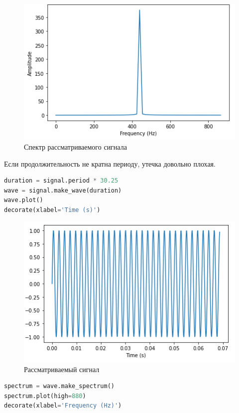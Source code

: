 \begin{figure}[H]
	\begin{center}
		\includegraphics[scale=1]{fig/lab03/lab03_02.png}
		\caption{Спектр рассматриваемого сигнала}
	\end{center}
\end{figure}

Если продолжительность не кратна периоду, утечка довольно плохая.

\begin{lstlisting}[language=Python]
duration = signal.period * 30.25
wave = signal.make_wave(duration)
wave.plot()
decorate(xlabel='Time (s)')
\end{lstlisting}

\begin{figure}[H]
	\begin{center}
		\includegraphics[scale=1]{fig/lab03/lab03_03.png}
		\caption{Рассматриваемый сигнал}
	\end{center}
\end{figure}

\begin{lstlisting}[language=Python]
spectrum = wave.make_spectrum()
spectrum.plot(high=880)
decorate(xlabel='Frequency (Hz)')
\end{lstlisting}

